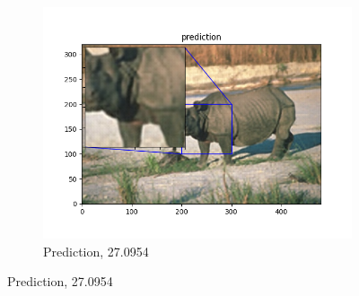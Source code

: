 \documentclass[12pt]{article}
\begin{document}
\begin{figure}[h!]
\begin{subfigure}[b]{0.32\linewidth}
    \includegraphics[width=\linewidth]{./3-prediction.png}
    \caption{Prediction, 27.0954}
  \end{subfigure}


\end{figure}
\end{document}
